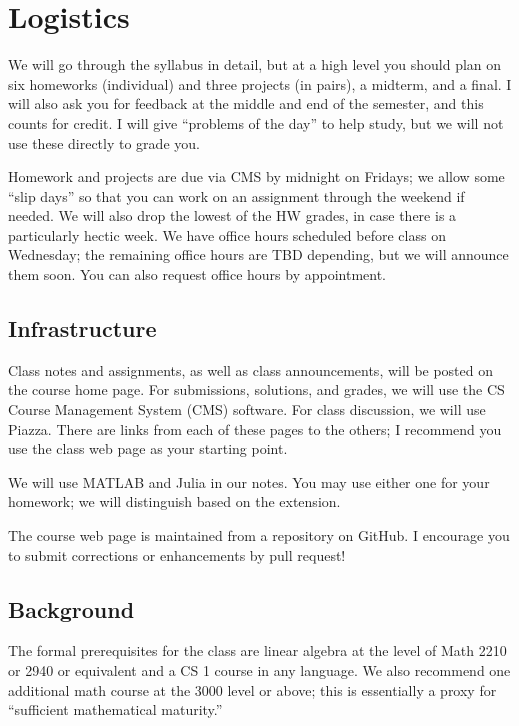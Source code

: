 \section{Logistics}

We will go through the syllabus in detail, but at a high level you
should plan on six homeworks (individual) and three projects (in
pairs), a midterm, and a final.  I will also ask you for feedback at
the middle and end of the semester, and this counts for credit.  I
will give ``problems of the day'' to help study, but we will not use
these directly to grade you.

Homework and projects are due via CMS by midnight on Fridays; we allow
some ``slip days'' so that you can work on an assignment through the
weekend if needed.  We will also drop the lowest of the HW grades, in
case there is a particularly hectic week.  We have office hours
scheduled before class on Wednesday; the remaining office hours are TBD
depending, but we will announce them soon.  You can also request office
hours by appointment.

\subsection{Infrastructure}

Class notes and assignments, as well as class announcements, will be
posted on the course home page.  For submissions, solutions, and
grades, we will use the CS Course Management System (CMS) software.
For class discussion, we will use Piazza.  There are links from each
of these pages to the others; I recommend you use the class web page
as your starting point.

We will use MATLAB and Julia in our notes.  You may use either one
for your homework; we will distinguish based on the extension.

The course web page is maintained from a repository on GitHub.
I encourage you to submit corrections or enhancements by pull
request!

\subsection{Background}

The formal prerequisites for the class are linear algebra at the level
of Math 2210 or 2940 or equivalent and a CS 1 course in any language.
We also recommend one additional math course at the 3000 level or
above; this is essentially a proxy for ``sufficient mathematical
maturity.''

